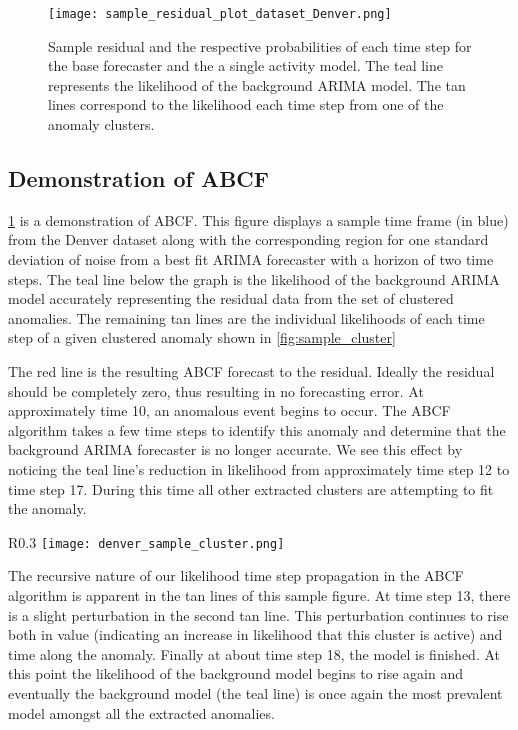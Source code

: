 
\begin{figure}[!t]
	\begin{center}
		\texttt{[image: sample\_residual\_plot\_dataset\_Denver.png]}
	\end{center}
	\caption{Sample residual and the respective probabilities of each time step for the base forecaster and the a single activity model.  The teal line represents the likelihood of the background ARIMA model.  The tan lines correspond to the likelihood each time step from one of the anomaly clusters.}
	\label{fig:sample_abcf_residual}
\end{figure}

\subsection{Demonstration of ABCF}
\ref{fig:sample_abcf_residual} is a demonstration of ABCF.  This figure displays a sample time frame (in blue) from the Denver dataset along with the corresponding region for one standard deviation of noise from a best fit ARIMA forecaster with a horizon of two time steps.  The teal line below the graph is the likelihood of the background ARIMA model accurately representing the residual data from the set of clustered anomalies.  The remaining tan lines are the individual likelihoods of each time step of a given clustered anomaly shown in \ref{fig:sample_cluster}  

The red line is the resulting ABCF forecast to the residual.  Ideally the residual should be completely zero, thus resulting in no forecasting error.  At approximately time 10, an anomalous event begins to occur.  The ABCF algorithm takes a few time steps to identify this anomaly and determine that the background ARIMA forecaster is no longer accurate.  We see this effect by noticing the teal line's reduction in likelihood from approximately time step 12 to time step 17.  During this time all other extracted clusters are attempting to fit the anomaly.

\begin{wrapfigure}{R}{0.3\textwidth}
\centering
\texttt{[image: denver\_sample\_cluster.png]}
\caption{Extracted sample clustered anomaly.}
\label{fig:sample_cluster}
\end{wrapfigure}

The recursive nature of our likelihood time step propagation in the ABCF algorithm is apparent in the tan lines of this sample figure.  At time step 13, there is a slight perturbation in the second tan line.  This perturbation continues to rise both in value (indicating an increase in likelihood that this cluster is active) and time along the anomaly.  Finally at about time step 18, the model is finished.  At this point the likelihood of the background model begins to rise again and eventually the background model (the teal line) is once again the most prevalent model amongst all the extracted anomalies.

